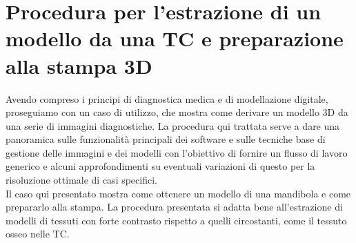 
\chapter{Procedura per l'estrazione di un modello da una TC e preparazione alla stampa 3D} %

\label{Chapter4} %
 


Avendo compreso i principi di diagnostica medica e di modellazione digitale, proseguiamo con un caso di utilizzo, che mostra come derivare un modello 3D da una serie di immagini diagnostiche. La procedura qui trattata serve a dare una panoramica sulle funzionalità principali dei software e sulle tecniche base di gestione delle immagini e dei modelli con l'obiettivo di fornire un flusso di lavoro generico e alcuni approfondimenti su eventuali variazioni di questo per la risoluzione ottimale di casi specifici.\\
Il caso qui presentato mostra come ottenere un modello di una mandibola e come prepararlo alla stampa. La procedura presentata si adatta bene all'estra\-zio\-ne di modelli di tessuti con forte contrasto rispetto a quelli circostanti, come il tessuto osseo nelle TC.

